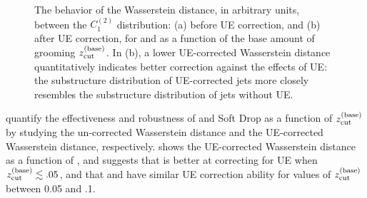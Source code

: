 \begin{figure}[]
\centerline{
}
\caption{
    The behavior of the Wasserstein distance, in arbitrary units, between the \(C_1^{(2)}\) distribution: (a) before UE correction, and (b) after UE correction, for  and  as a function of the base amount of grooming \(z_{\rm cut}^{(\rm base)}\).
    In (b), a lower UE-corrected Wasserstein distance quantitatively indicates better correction against the effects of UE:
    the substructure distribution of UE-corrected jets more closely resembles the substructure distribution of jets without UE.
}
\label{fig:ue_2}
\centering
\end{figure}


 quantify the effectiveness and robustness of  and Soft Drop as a function of \(z_{\rm cut}^{(\rm base)}\) by studying the un-corrected Wasserstein distance and the UE-corrected Wasserstein distance, respectively.
%
 shows the UE-corrected Wasserstein distance as a function of \zcut, and suggests that  is better at correcting for UE when \(z_{\rm cut}^{(\rm base)} \lesssim .05\), and that  and  have similar UE correction ability for values of \(z_{\rm cut}^{(\rm base)}\) between 0.05 and .1.

